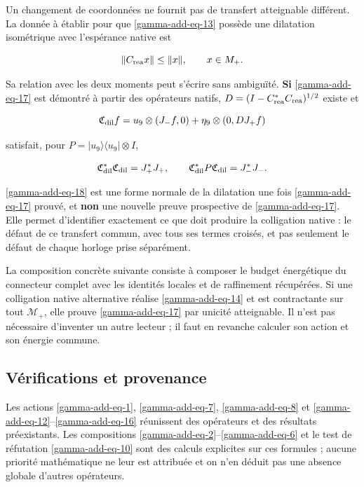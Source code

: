 Un changement de coordonnées ne fournit pas de transfert atteignable différent. La donnée à établir pour que \eqref{gamma-add-eq-13} possède une dilatation isométrique avec l'espérance native est

\begin{equation}
\|C_{\rm rea}x\|\le\|x\|,
\qquad x\in\mathcal M_+.
\label{gamma-add-eq-17}
\end{equation}

Sa relation avec les deux moments peut s'écrire sans ambiguïté. \textbf{Si} \eqref{gamma-add-eq-17} est démontré à partir des opérateurs natifs, \(D=(I-C_{\rm rea}^*C_{\rm rea})^{1/2}\) existe et

\begin{equation}
\mathfrak C_{\rm dil}f
=u_9\otimes(J_-f,0)+\eta_9\otimes(0,DJ_+f)
\label{gamma-add-eq-18}
\end{equation}

satisfait, pour \(P=|u_9\rangle\langle u_9|\otimes I\),

\begin{equation}
\mathfrak C_{\rm dil}^*\mathfrak C_{\rm dil}=J_+^*J_+,\qquad
\mathfrak C_{\rm dil}^*P\mathfrak C_{\rm dil}=J_-^*J_-.
\label{gamma-add-display-37}
\end{equation}

\eqref{gamma-add-eq-18} est une forme normale de la dilatation une fois \eqref{gamma-add-eq-17} prouvé, et \textbf{non} une nouvelle preuve prospective de \eqref{gamma-add-eq-17}. Elle permet d'identifier exactement ce que doit produire la colligation native : le défaut de ce transfert commun, avec tous ses termes croisés, et pas seulement le défaut de chaque horloge prise séparément.

La composition concrète suivante consiste à composer le budget énergétique du connecteur complet avec les identités locales et de raffinement récupérées. Si une colligation native alternative réalise \eqref{gamma-add-eq-14} et est contractante sur tout \(\mathcal M_+\), elle prouve \eqref{gamma-add-eq-17} par unicité atteignable. Il n'est pas nécessaire d'inventer un autre lecteur ; il faut en revanche calculer son action et son énergie commune.

\subsection{Vérifications et provenance}
\label{gamma-add-sub-412}

Les actions \eqref{gamma-add-eq-1}, \eqref{gamma-add-eq-7},
\eqref{gamma-add-eq-8} et \eqref{gamma-add-eq-12}--\eqref{gamma-add-eq-16}
réunissent des opérateurs et des résultats préexistants. Les compositions
\eqref{gamma-add-eq-2}--\eqref{gamma-add-eq-6} et le test de réfutation
\eqref{gamma-add-eq-10} sont des calculs explicites sur ces formules ;
aucune priorité mathématique ne leur est attribuée et on n'en déduit pas une
absence globale d'autres opérateurs.

